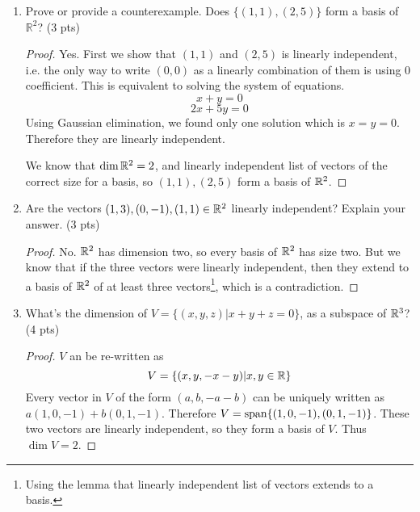 \documentclass{amsart}
\begin{document}
	
\vspace{2em}


\begin{enumerate}
\item Prove or provide a counterexample. Does $\{(1,1),(2,5)\}$ form a basis of $\mathbb{R}^2$? (3 pts)
\begin{proof}
	Yes. First we show that $(1,1)$ and $(2,5)$ is linearly independent, i.e. the only way to write $(0,0)$ as a linearly combination of them is using $0$ coefficient. This is equivalent to solving the system of equations.
	\[x+y =0\]
	\[2x+5y=0\]
	Using Gaussian elimination, we found only one solution which is $x=y=0$. Therefore they are linearly independent.
	
	We know that $\dim \mathbb{R}^2 =2$, and linearly independent list of vectors of the correct size for a basis, so $(1,1),(2,5)$ form a basis of $\mathbb{R}^2$.
\end{proof}
\item Are the vectors $(1,3),(0,-1),(1,1)\in\mathbb{R}^2$ linearly independent? Explain your answer. (3 pts)
\begin{proof}
	No. $\mathbb{R}^2$ has dimension two, so every basis of $\mathbb{R}^2$ has size two. But we know that if the three vectors were linearly independent, then they extend to a basis of $\mathbb{R}^2$ of at least three vectors\footnote{Using the lemma that linearly independent list of vectors extends to a basis.}, which is a contradiction.
\end{proof}
\item What's the dimension of $V = \{(x,y,z)|x+y+z = 0\}$, as a subspace of $\mathbb{R}^3$? (4 pts)
\begin{proof}
	$V$ an be re-written as
	\[V=\{(x,y,-x-y)|x,y\in\mathbb{R}\}\]
	Every vector in $V$ of the form $(a,b,-a-b)$ can be uniquely written as $a(1,0,-1)+b(0,1,-1)$. Therefore $V = \operatorname{span}\{(1,0,-1),(0,1,-1)\}$. These two vectors are linearly independent, so they form a basis of $V$. Thus $\dim V = 2$.
\end{proof}
\end{enumerate}


%
%
\end{document}
